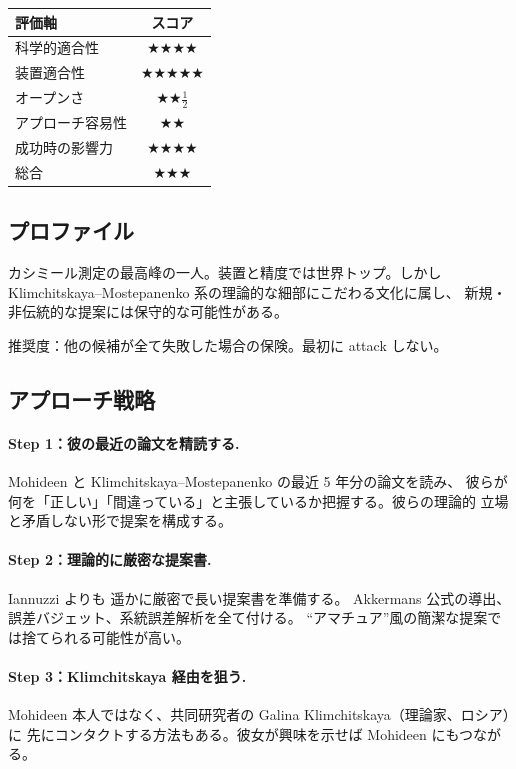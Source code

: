 \documentclass[11pt,a4paper]{article}
\def\textbf#1{#1}%
\begin{document}
\begin{center}
\begin{tabular}{lc}
\toprule
評価軸 & スコア \\
\midrule
科学的適合性    & ★★★★ \\
装置適合性      & ★★★★★ \\
オープンさ      & ★★$\frac{1}{2}$ \\
アプローチ容易性 & ★★ \\
成功時の影響力  & ★★★★ \\
\midrule
\textbf{総合}   & \textbf{★★★} \\
\bottomrule
\end{tabular}
\end{center}

\subsection{プロファイル}

カシミール測定の最高峰の一人。\textbf{装置と精度では世界トップ}。しかし
Klimchitskaya--Mostepanenko 系の理論的な細部にこだわる文化に属し、
\textbf{新規・非伝統的な提案には保守的}な可能性がある。

\textbf{推奨度}：他の候補が全て失敗した場合の保険。最初に attack しない。

\subsection{アプローチ戦略}

\paragraph{Step 1：彼の最近の論文を精読する.}
Mohideen と Klimchitskaya--Mostepanenko の最近 5 年分の論文を読み、
彼らが何を「正しい」「間違っている」と主張しているか把握する。彼らの理論的
立場と矛盾しない形で提案を構成する。

\paragraph{Step 2：理論的に厳密な提案書.}
Iannuzzi よりも \textbf{遥かに厳密で長い}提案書を準備する。
Akkermans 公式の導出、誤差バジェット、系統誤差解析を全て付ける。
``アマチュア''風の簡潔な提案では捨てられる可能性が高い。

\paragraph{Step 3：Klimchitskaya 経由を狙う.}
Mohideen 本人ではなく、共同研究者の Galina Klimchitskaya（理論家、ロシア）に
先にコンタクトする方法もある。彼女が興味を示せば Mohideen にもつながる。
\end{document}
